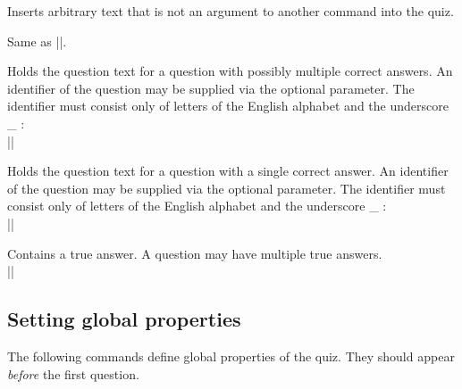 \documentclass[a4paper,10pt]{ltxdoc}
\begin{document}

\DescribeMacro{\intro} Inserts arbitrary text that is not an argument to another
command into the quiz.

\DescribeMacro{\keepme} Same as |\intro|.

\DescribeMacro{\question} Holds the question text for a question with
possibly multiple correct answers.
An identifier of the
question may be supplied via the optional parameter. The identifier must
consist only of letters of the English alphabet and the underscore \_ :\\
||

\DescribeMacro{\questionSc}
Holds the question text for a question with a single correct answer.
An identifier of the
question may be supplied via the optional parameter. The identifier must
consist only of letters of the English alphabet and the underscore \_ :\\
||


\DescribeMacro{\true} Contains a true answer. A question may have multiple
true answers.\\
||



\subsection{Setting global properties}
The following commands define global properties of the quiz. They should
appear \emph{before} the first question.
\end{document}
